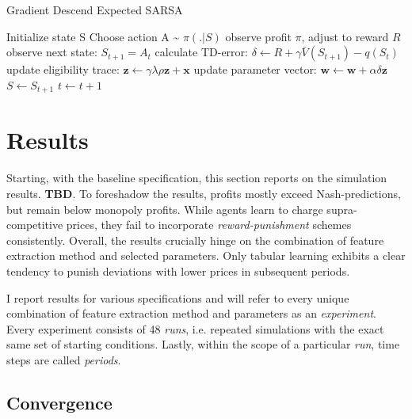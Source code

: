 

\pagebreak
\begin{algorithm}
	\caption{Gradient Descend Expected SARSA}
	\begin{algorithmic}[]
		\small
		\STATE Initialize state S
		\STATE Choose action A \~{} $\pi(.|S)$
		\STATE observe profit $\pi$, adjust to reward $R$
		\STATE observe next state: $S_{t+1} = A_t$
		\STATE calculate TD-error: $\delta \leftarrow R +  \gamma \bar{V}(S_{t+1}) - q(S_t)$
		\STATE update eligibility trace: $\boldsymbol{z} \leftarrow \gamma \lambda \rho \boldsymbol{z} + \boldsymbol{x} $
		\STATE update parameter vector: $\boldsymbol{w} \leftarrow \boldsymbol{w} + \alpha  \delta  \boldsymbol{z}$
		\STATE $S \leftarrow S_{t+1}$
		\STATE $t \leftarrow t+1$
		\ENDWHILE
	\end{algorithmic}
\end{algorithm}
















\section{Results}
Starting, with the baseline specification, this section reports on the simulation results. \textbf{TBD}. To foreshadow the results, profits mostly exceed Nash-predictions, but remain below monopoly profits. While agents learn to charge supra-competitive prices, they fail to incorporate \emph{reward-punishment} schemes consistently. Overall, the results crucially hinge on the combination of feature extraction method and selected parameters. Only tabular learning exhibits a clear tendency to punish deviations with lower prices in subsequent periods.

I report results for various specifications and will refer to every unique combination of feature extraction method and parameters as an \emph{experiment}. Every experiment consists of 48 \emph{runs}, i.e. repeated simulations with the exact same set of starting conditions. Lastly, within the scope of a particular \emph{run}, time steps are called \emph{periods}.

\subsection{Convergence}\label{convergence}

